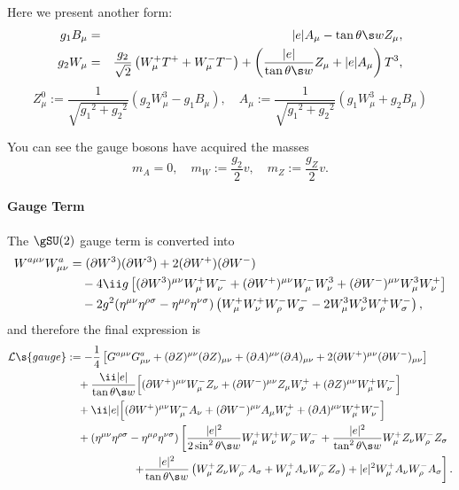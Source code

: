 \begin{rightnote}
Here we present another form:
\begin{eqnarray}
  g_1B_\mu
&=& |e| A_\mu-\tan\theta\s w Z_\mu,\\
 g_2W_\mu
&=& \frac{g_2}{\sqrt2}\left(W^+_\mu T^+ + W^-_\mu T^-\right)
   +\left(\frac{|e|}{\tan\theta\s w}Z_\mu+|e|A_\mu\right)T^3,
\end{eqnarray}
\begin{equation}
Z^0_\mu:=\frac1{\sqrt{{g_1}^2+{g_2}^2}}(g_2 W^3_\mu-g_1B_\mu),\quad
A_\mu:=\frac1{\sqrt{{g_1}^2+{g_2}^2}}(g_1 W^3_\mu+g_2B_\mu)
\end{equation}\vspace{-2em}
\end{rightnote}

You can see the gauge bosons have acquired the masses
\begin{equation}
  m_A = 0, \quad m_W :=\frac{g_2}2v,\quad m_Z :=\frac{g_Z}2v.
\end{equation}


\paragraph{Gauge Term}
The $\gSU(2)$ gauge term is converted into
\begin{align*}
   W^{a\mu\nu}W^a_{\mu\nu}
&= (\partial W^3)(\partial W^3) + 2(\partial W^+)(\partial W^-)
\\&\quad
- 4\ii g\left[
     (\partial W^3)^{\mu\nu}W^+_\mu W^-_\nu
   + (\partial W^+)^{\mu\nu}W^-_\mu W^3_\nu
   + (\partial W^-)^{\mu\nu}W^3_\mu W^+_\nu
\right]
\\&\quad
 -2g^2(\Hmn\Hrs-\Hmr\Hns)
\left(
  W^+_\mu W^+_\nu W^-_\rho W^-_\sigma  - 2 W^3_\mu W^3_\nu W^+_\rho W^-_\sigma
\right),
\end{align*}
and therefore the final expression is
\begin{equation}
\label{eq:SMGaugeKineticGZG}
\begin{split}
 \Lag\s{gauge}&:=
-\frac14\left[
G^{a\mu\nu}G^a_{\mu\nu} + (\partial Z)^{\mu\nu}(\partial Z)_{\mu\nu}+(\partial A)^{\mu\nu}(\partial A)_{\mu\nu}+2(\partial W^+)^{\mu\nu}(\partial W^-)_{\mu\nu}
\right]\\&\quad
+\frac{\ii |e|}{\tan\theta\s w}\Bigl[
(\partial W^+)^{\mu\nu}W^-_\mu Z_\nu + (\partial W^-)^{\mu\nu}Z_\mu W^+_\nu +  (\partial Z)^{\mu\nu}W^+_\mu W^-_\nu
\Bigr]\\&\quad
+ \ii |e|\Bigl[
(\partial W^+)^{\mu\nu}W^-_\mu A_\nu + (\partial W^-)^{\mu\nu}A_\mu W^+_\nu +  (\partial A)^{\mu\nu}W^+_\mu W^-_\nu
\Bigr]\\&\quad
+(\Hmn\Hrs-\Hmr\Hns)\left[
\frac{|e|^2}{2\sin^2\theta\s w}W^+_\mu W^+_\nu W^-_\rho W^-_\sigma
+\frac{|e|^2}{\tan^2\theta\s w}W^+_\mu Z_\nu W^-_\rho Z_\sigma
\right.\\&\left.\qquad\qquad\qquad
+\frac{|e|^2}{\tan\theta\s w}\left(W^+_\mu Z_\nu W^-_\rho A_\sigma + W^+_\mu A_\nu W^-_\rho Z_\sigma\right)
+|e|^2W^+_\mu A_\nu W^-_\rho A_\sigma\right].
\end{split}
\end{equation}

